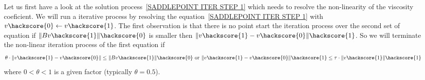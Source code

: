 Let us first have a look at the solution process~\ref{SADDLEPOINT ITER STEP 1} which needs to resolve the 
non-linearity of the viscosity coeficient. We will run a iterative process by resolving 
the equation~\ref{SADDLEPOINT ITER STEP 1} with $v\hackscore{0} \leftarrow v\hackscore{1}$. The first observation is that there is no point start
the iteration process over the second set of equation if $\|Bv\hackscore{1}\|\hackscore{0}$
is smaller then $\|v\hackscore{1}-v\hackscore{0}\|\hackscore{1}$. So we will terminate the non-linear iteration
process of the first equation if
 \begin{equation}
\theta \cdot \|v\hackscore{1}-v\hackscore{0}\| \le \|Bv\hackscore{1}\|\hackscore{0}
\mbox{ or }
\|v\hackscore{1}-v\hackscore{0}\|\hackscore{1} \le \tau \cdot \|v\hackscore{1}\|\hackscore{1} 
\end{equation}
where $0<\theta<1$ is a given factor (typically $\theta=0.5$). 

